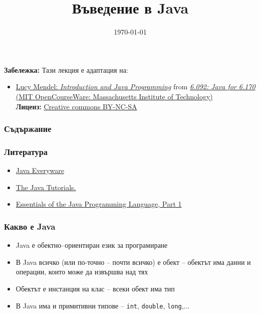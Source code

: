 \documentclass[ignorenonframetext, hyperref=unicode,unicode]{beamer}
\title{Въведение в Java}
\date{\today}
\begin{document}
\frame{\titlepage}

\begin{frame}
\small
{\bf Забележка:} Тази лекция е адаптация на:
\begin{itemize}
  \item \href{http://ocw.mit.edu/NR/rdonlyres/Electrical-Engineering-and-Computer-Science/6-092January--IAP--2006/2C5A832A-E1BA-4104-A129-CC998C7B95FC/0/lecture1a.pdf}{Lucy Mendel: {\em Introduction and Java Programming}} from
\href{http://ocw.mit.edu/OcwWeb/Electrical-Engineering-and-Computer-Science/6-092January--IAP--2006/CourseHome/index.htm}{
{\em 6.092: Java for 6.170} (MIT OpenCourseWare:
Massachusetts Institute of Technology)}\\
{\bf Лиценз:}
\href{http://ocw.mit.edu/OcwWeb/web/terms/terms/index.htm\#cc}{Creative commons
BY-NC-SA}  

\end{itemize}

\end{frame}

\begin{frame}
\frametitle{Съдържание}
\tableofcontents %
\end{frame}


\begin{frame}
 \frametitle{Литература}
\begin{itemize}
\item
\href{http://computing.open.ac.uk/m254/}{Java Everyware}
\item
\href{http://java.sun.com/docs/books/tutorial/index.html}{The
Java Tutorials.}
\item
\href{http://java.sun.com/developer/onlineTraining/Programming/BasicJava1/}{Essentials of the Java Programming Language, Part 1}

\end{itemize}
\end{frame}

\begin{frame}
 \frametitle{Какво е Java}
\begin{itemize}
\item Java е обектно–ориентиран език за програмиране
\item В Java всичко (или по-точно -- почти всичко) е обект -- обектът има данни и операции, които може да извършва над тях
\item Обектът е инстанция на клас -- всеки обект има тип
\item В Java има и примитивни типове -- \lstinline{int},  \lstinline{double}, \lstinline{long},...
\end{itemize}
\end{frame}
\end{document}
